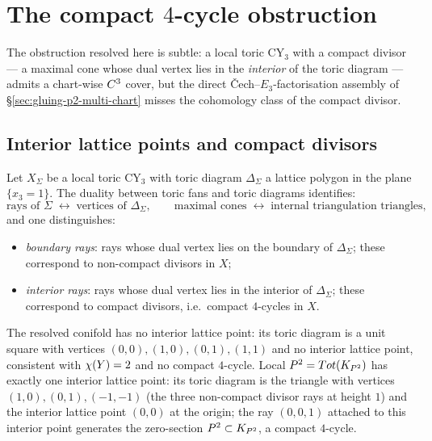\section{The compact $4$-cycle obstruction}
\label{sec:gluing-p2-compact-cycle}

The obstruction resolved here is subtle: a local toric CY$_3$ with a
compact divisor --- a maximal cone whose dual vertex lies in the
\emph{interior} of the toric diagram --- admits a chart-wise $C^3$ cover,
but the direct \v{C}ech--$E_3$-factorisation assembly of
\S\ref{sec:gluing-p2-multi-chart} misses the cohomology class of the
compact divisor.

\subsection{Interior lattice points and compact divisors}

Let $X_\Sigma$ be a local toric CY$_3$ with toric diagram $\Delta_\Sigma$ a
lattice polygon in the plane $\{x_3 = 1\}$.  The duality between toric
fans and toric diagrams identifies:
\[
  \text{rays of } \Sigma \;\longleftrightarrow\; \text{vertices of } \Delta_\Sigma,
  \qquad
  \text{maximal cones} \;\longleftrightarrow\; \text{internal triangulation triangles},
\]
and one distinguishes:
\begin{itemize}
\item \emph{boundary rays}: rays whose dual vertex lies on the boundary of
  $\Delta_\Sigma$; these correspond to non-compact divisors in $X$;
\item \emph{interior rays}: rays whose dual vertex lies in the interior
  of $\Delta_\Sigma$; these correspond to compact divisors, i.e.\ compact
  $4$-cycles in $X$.
\end{itemize}
The resolved conifold has no interior lattice point: its toric diagram is a
unit square with vertices $(0,0), (1,0), (0,1), (1,1)$ and no interior
lattice point, consistent with $\chi(Y) = 2$ and no compact $4$-cycle.
Local $P^2 = Tot(K_{P^2})$ has exactly one interior lattice
point: its toric diagram is the triangle with vertices $(1,0), (0,1),
(-1,-1)$ (the three non-compact divisor rays at height $1$) and the
interior lattice point $(0,0)$ at the origin; the ray $(0,0,1)$ attached
to this interior point generates the zero-section $P^2 \subset K_{P^2}$,
a compact $4$-cycle.

